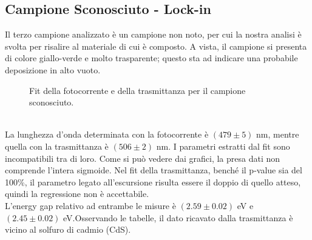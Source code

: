 \documentclass[11pt]{article} %
\begin{document}
\subsection{Campione Sconosciuto - Lock-in}
Il terzo campione analizzato è un campione non noto, per cui la nostra analisi è svolta per risalire al materiale di cui è composto. A vista, il campione si presenta di colore giallo-verde e molto trasparente; questo sta ad indicare una probabile deposizione in alto vuoto. 
\begin{figure}[!h]
\centering
\caption{Fit della fotocorrente e della trasmittanza per il campione sconosciuto.}
\end{figure}
\\La lunghezza d'onda determinata con la fotocorrente è $\left(479\pm5\right)$ nm, mentre quella con la trasmittanza è $\left(506\pm2\right)$ nm.
I parametri estratti dal fit sono incompatibili tra di loro. Come si può vedere dai grafici, la presa dati non comprende l'intera sigmoide. Nel fit della trasmittanza, benché il p-value sia del 100\%, il parametro legato all'escursione risulta essere il doppio di quello atteso, quindi la regressione non è accettabile. \\L'energy gap relativo ad entrambe le misure è $\left(2.59\pm0.02\right)$ eV e $\left(2.45\pm0.02\right)$ eV.Osservando le tabelle, il dato ricavato dalla trasmittanza è vicino al solfuro di cadmio (CdS).
\end{document}
